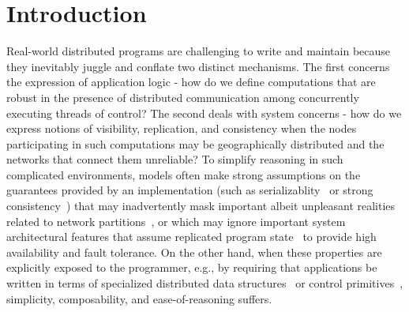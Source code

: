 \section{Introduction}

Real-world distributed programs are challenging to write and maintain
because they inevitably juggle and conflate two distinct mechanisms.
The first concerns the expression of application logic - how do we
define computations that are robust in the presence of distributed
communication among concurrently executing threads of control?  The
second deals with system concerns - how do we express notions of
visibility, replication, and consistency when the nodes participating
in such computations may be geographically distributed and the
networks that connect them unreliable?  To simplify reasoning in such
complicated environments, models often make strong assumptions on the
guarantees provided by an implementation (such as
serializablity~\cite{...} or strong consistency~\cite{...}) that may
inadvertently mask important albeit unpleasant realities related to
network partitions~\cite{...}, or which may ignore important system
architectural features that assume replicated program state~\cite{...}
to provide high availability and fault tolerance.  On the other hand,
when these properties are explicitly exposed to the programmer, e.g.,
by requiring that applications be written in terms of specialized
distributed data structures~\cite{...} or control
primitives~\cite{...}, simplicity, composability, and
ease-of-reasoning suffers.

